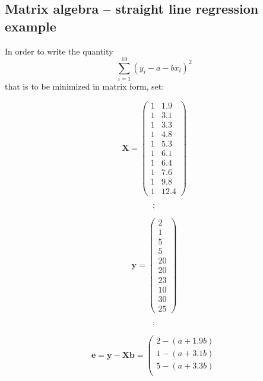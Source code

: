 \documentclass{tufte-book}\usepackage[]{graphicx}\usepackage[]{color}
\begin{document}
\subsection{Matrix algebra -- straight line regression example}
In order to write the quantity
\[\sum_{i=1}^{10} (y_i - a - b x_i)^2\]
that is to be minimized in matrix form, set:
\begin{fullwidth}
\begin{minipage}[c]{0.25\textwidth}
\[
\mathbf{X} = \left( \begin{array}{cc}
  1 & 1.9\\
  1 & 3.1\\
  1 & 3.3\\
  1 & 4.8\\
  1 & 5.3\\
  1 & 6.1\\
  1 & 6.4\\
  1 & 7.6\\
  1 & 9.8\\
  1 & 12.4
\end{array} \right)
\]
    \end{minipage}
\begin{minipage}[c]{0.015\textwidth}
\[\mathbf{;}\]
\end{minipage}
\hspace{0.025\textwidth}
    \begin{minipage}[c]{0.18\textwidth}
\[
\mathbf{y} = \left( \begin{array}{c}
  2\\
  1\\
  5\\
  5\\
 20\\
 20\\
 23\\
 10\\
 30\\
 25
\end{array} \right)
\]
    \end{minipage}
    \begin{minipage}[c]{0.015\textwidth}
\[\mathbf{;}\]
\end{minipage}\hspace{0.05\textwidth}
\begin{minipage}[c]{0.44\textwidth}
\[\mathbf{e} = \mathbf{y} - \mathbf{X} \mathbf{b} =
\left( \begin{array}{c}
  2  - (a + 1.9 b)\\
  1  - (a + 3.1 b)\\
  5  - (a + 3.3 b)\\

\end{array}\]
\end{minipage}
\end{fullwidth}
\end{document}
